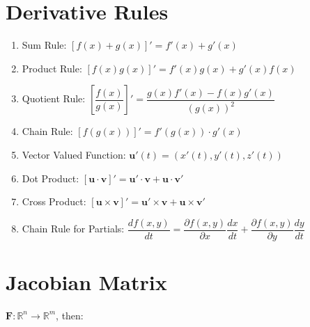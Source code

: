\documentclass[10pt]{article}
\begin{document}
\section*{Derivative Rules}
\begin{enumerate}
  \item Sum Rule: $[f(x) + g(x)]' = f'(x) + g'(x)$
  \item Product Rule: $[f(x)g(x)]' = f'(x)g(x) + g'(x)f(x)$
  \item Quotient Rule: $\left[\dfrac{f(x)}{g(x)}\right]' = \dfrac{g(x)f'(x)-f(x)g'(x)}{(g(x))^2}$
  \item Chain Rule: $[f(g(x))]'=f'(g(x))\cdot g'(x)$
  \item Vector Valued Function: $\mathbf{u}'(t) = (x'(t),y'(t),z'(t))$
  \item Dot Product: $[\mathbf{u} \cdot \mathbf{v}]' = \mathbf{u}' \cdot \mathbf{v} + \mathbf{u} \cdot \mathbf{v}'$
  \item Cross Product: $[\mathbf{u} \times \mathbf{v}]' = \mathbf{u}' \times \mathbf{v} + \mathbf{u} \times \mathbf{v}'$
  \item Chain Rule for Partials: $\dfrac{df(x,y)}{dt} = \dfrac{\partial f(x,y)}{\partial x}\dfrac{dx}{dt} +
    \dfrac{\partial f(x,y)}{\partial y}\dfrac{dy}{dt}$
\end{enumerate}
\section*{Jacobian Matrix}
$\mathbf{F}: \mathbb{R}^n \to \mathbb{R}^m$, then:
\end{document}

